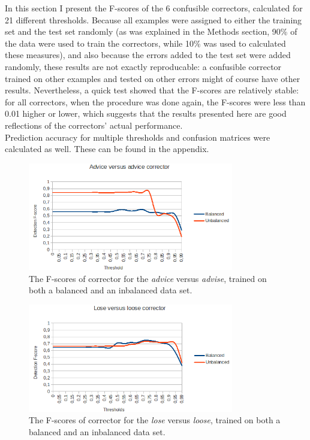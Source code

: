 \documentclass[12pt]{article}
\begin{document}
In this section I present the F-scores of the 6 confusible correctors, calculated for 21 different thresholds. Because all examples were assigned to either the training set and the test set randomly (as was explained in the Methods section, 90\% of the data were used to train the correctors, while 10\% was used to calculated these measures), and also because the errors added to the test set were added randomly, these results are not exactly reproducable: a confusible corrector trained on other examples and tested on other errors might of course have other results. Nevertheless, a quick test showed that the F-scores are relatively stable: for all correctors, when the procedure was done again, the F-scores were less than 0.01 higher or lower, which suggests that the results presented here are good reflections of the correctors' actual performance.\\\indent
Prediction accuracy for multiple thresholds and confusion matrices were calculated as well. These can be found in the appendix.

\begin{figure}[H]
\centering
\includegraphics[width=0.8\textwidth]{fscore_adviceadvise.png}
\caption{The F-scores of corrector for the \emph{advice} versus \emph{advise}, trained on both a balanced and an inbalanced data set.}
\end{figure}

\begin{figure}[H]
\centering
\includegraphics[width=0.8\textwidth]{fscore_loseloose.png}
\caption{The F-scores of corrector for the \emph{lose} versus \emph{loose}, trained on both a balanced and an inbalanced data set.}
\end{figure}
\end{document}
